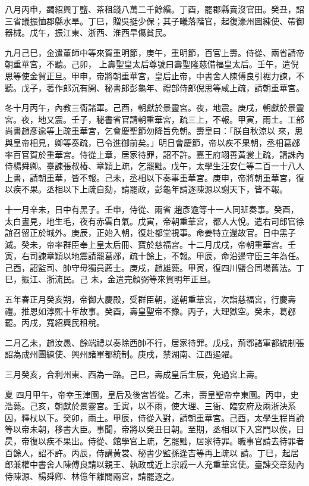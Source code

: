 \begin{pinyinscope}
 八月丙申，蠲紹興丁鹽、茶租錢八萬二千餘緡。丁酉，罷郡縣賣沒官田。癸丑，詔三省議振恤郡縣水旱。丁巳，贈吳挺少保；其子曦落階官，起復濠州圖練使、帶御器械。戊午，振江東、浙西、淮西旱傷貧民。



 九月己巳，金遣董師中等來賀重明節，庚午，重明節，百官上壽。侍從、兩省請帝朝重華宮，不聽。己卯，
 上壽聖皇太后尊號曰壽聖隆慈備福皇太后。壬午，遣倪思等使金賀正旦。甲申，帝將朝重華宮，皇后止帝，中書舍人陳傅良引裾力諫，不聽。戊子，著作郎沉有開、秘書郎彭龜年、禮部侍郎倪思等咸上疏，請朝重華宮。



 冬十月丙午，內教三衙諸軍。己酉，朝獻於景靈宮。夜，地震。庚戌，朝獻於景靈宮。夜，地又震。壬子，秘書省官請朝重華宮，疏三上，不報。甲寅，雨土。工部尚書趙彥逾等上疏重華宮，乞會慶聖節勿降旨免朝。壽皇曰：「朕自秋涼以
 來，思與皇帝相見，卿等奏疏，已令進御前矣。」明日會慶節，帝以疾不果朝，丞相葛邲率百官賀於重華宮。侍從上章，居家待罪，詔不許。嘉王府翊善黃裳上疏，請誅內侍楊舜卿。臺諫張叔椿、章穎上疏，乞罷黜。戊午，太學生汪安仁等二百一十八人上書，請朝重華，皆不報。己未，丞相以下奏事重華宮。庚申，帝將朝重華宮，復以疾不果。丞相以下上疏自劾，請罷政，彭龜年請逐陳源以謝天下，皆不報。



 十一月辛未，日中有黑子。壬申，侍從、兩省
 趙彥逾等十一人同班奏事。癸酉，太白晝見，地生毛，夜有赤雲白氣。戊寅，帝朝重華宮，都人大悅。遣右司郎官徐誼召留正於城外。庚辰，正始入朝，復赴都堂視事。命姜特立還故官。日中黑子滅。癸未，帝率群臣奉上皇太后冊、寶於慈福宮。十二月戊戌，帝朝重華宮。壬寅，右司諫章穎以地震請罷葛邲，疏十餘上，不報。甲辰，命沿邊守臣三年為任。己酉，詔監司、帥守毋獨員薦士。庚戌，趙雄薨。甲寅，復四川鹽合同場舊法。丁巳，振江、浙流民。己
 未，金遣完顏弼等來賀明年正旦。



 五年春正月癸亥朔，帝御大慶殿，受群臣朝，遂朝重華宮，次詣慈福宮，行慶壽禮。推恩如淳熙十年故事。癸酉，壽皇聖帝不豫。丙子，大理獄空。癸未，葛邲罷。丙戌，寬紹興民租稅。



 二月乙未，趙汝愚、餘端禮以奏除西帥不行，居家待罪。戊戌，荊鄂諸軍都統制張詔為成州團練使、興州諸軍都統制。庚戌，禁湖南、江西遏糴。



 三月癸亥，合利州東、西為一路。己巳，壽成皇后生辰，免過宮上壽。



 夏
 四月甲午，帝幸玉津園，皇后及後宮皆從。乙未，壽皇聖帝幸東園。丙申，史浩薨。己亥，朝獻於景靈宮。壬寅，以不雨，使大理、三衙、臨安府及兩浙決系囚，釋杖以下。癸卯，雨土。甲辰，侍從入對，請朝重華宮。己酉，太學生程肖說等以帝未朝，移書大臣。事聞，帝將以癸丑日朝。至期，丞相以下入宮門以俟，日昃，帝復以疾不果出。侍從、館學官上疏，乞罷黜，居家待罪。職事官請去待罪者百餘人，詔不許。丙辰，侍講黃裳、秘書少監孫逢吉等再上疏以
 請。丁巳，起居郎兼權中書舍人陳傅良請以親王、執政或近上宗戚一人充重華宮使。臺諫交章劾內侍陳源、楊舜卿、林億年離間兩宮，請罷逐之。




\end{pinyinscope}
